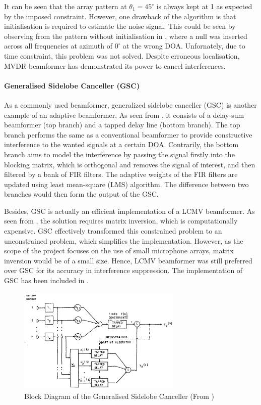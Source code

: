 \documentclass[a4paper,twoside,12pt,hidelinks]{article}
\begin{document}
It can be seen that the array pattern at $\theta_1=45^\circ$ is always kept at 1 as expected by the imposed constraint. However, one drawback of the algorithm is that initialisation is required to estimate the noise signal. This could be seen by observing from the pattern without initialisation in , where a null was inserted across all frequencies at azimuth of $0^\circ$ at the wrong DOA. Unfornately, due to time constraint, this problem was not solved. Despite erroneous localisation, MVDR beamformer has demonstrated its power to cancel interferences. 

\paragraph{Generalised Sidelobe Canceller (GSC)}
As a commonly used beamformer, generalized sidelobe canceller (GSC) \cite{Griffiths1982AnBeamforming} is another example of an adaptive beamformer. As seen from , it consists of a delay-sum beamformer (top branch) and a tapped delay line (bottom branch). The top branch performs the same as a conventional beamformer to provide constructive interference to the wanted signals at a certain DOA. Contrarily, the bottom branch aims to model the interference by passing the signal firstly into the blocking matrix, which is orthogonal and removes the signal of interest, and then filtered by a bank of FIR filters. The adaptive weights of the FIR filters are updated using least mean-square (LMS) algorithm. The difference between two branches would then form the output of the GSC.

Besides, GSC is actually an efficient implementation of a LCMV beamformer. As seen from , the solution requires matrix inversion, which is computationally expensive. GSC effectively transformed this constrained problem to an unconstrained problem, which simplifies the implementation. However, as the scope of the project focuses on the use of small microphone arrays, matrix inversion would be of a small size. Hence, LCMV beamformer was still preferred over GSC for its accuracy in interference suppression. The implementation of GSC has been included in .

\begin{figure}[H]
\centering
\captionsetup{justification=centering}
\includegraphics[width=0.7\textwidth]{gsc_signal_flow}
\caption{Block Diagram of the Generalised Sidelobe Canceller (From \cite{Griffiths1982AnBeamforming})}
\label{fig:gsc}
\end{figure}
\end{document}
